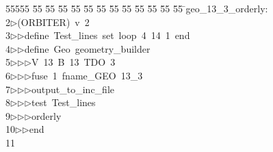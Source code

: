 %
%
\begin{tabbing}
55555 \= 55 \= 55 \= 55 \= 55 \= 55 \= 55 \= 55 \= 55 \= 55 \= 55 \= 55 \= 55 \= \>geo\_13\_3\_orderly:\\[0pt]
2\>$\triangleright$\>(ORBITER)\ v\ 2\ \\[0pt]
3\>$\triangleright$\>$\triangleright$\>define\ Test\_lines\ set\ loop\ 4\ 14\ 1\ end\ \\[0pt]
4\>$\triangleright$\>$\triangleright$\>define\ Geo\ geometry\_builder\ \\[0pt]
5\>$\triangleright$\>$\triangleright$\>$\triangleright$\>V\ 13\ B\ 13\ TDO\ 3\ \\[0pt]
6\>$\triangleright$\>$\triangleright$\>$\triangleright$\>fuse\ 1\ fname\_GEO\ 13\_3\ \\[0pt]
7\>$\triangleright$\>$\triangleright$\>$\triangleright$\>output\_to\_inc\_file\ \\[0pt]
8\>$\triangleright$\>$\triangleright$\>$\triangleright$\>test\ Test\_lines\ \\[0pt]
9\>$\triangleright$\>$\triangleright$\>$\triangleright$\>orderly\ \\[0pt]
10\>$\triangleright$\>$\triangleright$\>end\\[0pt]
11\>\end{tabbing}
